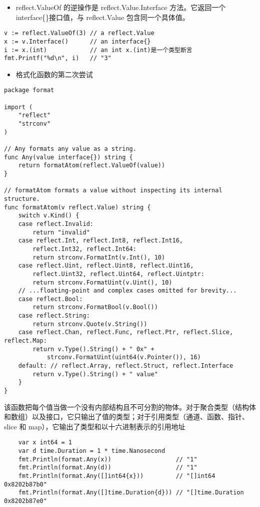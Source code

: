 \begin{itemize}
\tightlist
\item
  reflect.ValueOf 的逆操作是 reflect.Value.Interface
  方法。它返回一个interface\{\}接口值，与 reflect.Value
  包含同一个具体值。
\end{itemize}

\begin{verbatim}
v := reflect.ValueOf(3) // a reflect.Value
x := v.Interface()      // an interface{}
i := x.(int)            // an int x.(int)是一个类型断言
fmt.Printf("%d\n", i)   // "3"
\end{verbatim}

\begin{itemize}
\tightlist
\item
  格式化函数的第二次尝试
\end{itemize}

\begin{verbatim}
package format

import (
    "reflect"
    "strconv"
)

// Any formats any value as a string.
func Any(value interface{}) string {
    return formatAtom(reflect.ValueOf(value))
}

// formatAtom formats a value without inspecting its internal structure.
func formatAtom(v reflect.Value) string {
    switch v.Kind() {
    case reflect.Invalid:
        return "invalid"
    case reflect.Int, reflect.Int8, reflect.Int16,
        reflect.Int32, reflect.Int64:
        return strconv.FormatInt(v.Int(), 10)
    case reflect.Uint, reflect.Uint8, reflect.Uint16,
        reflect.Uint32, reflect.Uint64, reflect.Uintptr:
        return strconv.FormatUint(v.Uint(), 10)
    // ...floating-point and complex cases omitted for brevity...
    case reflect.Bool:
        return strconv.FormatBool(v.Bool())
    case reflect.String:
        return strconv.Quote(v.String())
    case reflect.Chan, reflect.Func, reflect.Ptr, reflect.Slice, reflect.Map:
        return v.Type().String() + " 0x" +
            strconv.FormatUint(uint64(v.Pointer()), 16)
    default: // reflect.Array, reflect.Struct, reflect.Interface
        return v.Type().String() + " value"
    }
}
\end{verbatim}

该函数把每个值当做一个没有内部结构且不可分割的物体。对于聚合类型（结构体和数组）以及接口，它只输出了值的类型；对于引用类型（通道、函数、指针、slice
和 map），它输出了类型和以十六进制表示的引用地址

\begin{verbatim}
    var x int64 = 1
    var d time.Duration = 1 * time.Nanosecond
    fmt.Println(format.Any(x))                  // "1"
    fmt.Println(format.Any(d))                  // "1"
    fmt.Println(format.Any([]int64{x}))         // "[]int64 0x8202b87b0"
    fmt.Println(format.Any([]time.Duration{d})) // "[]time.Duration 0x8202b87e0"
\end{verbatim}

